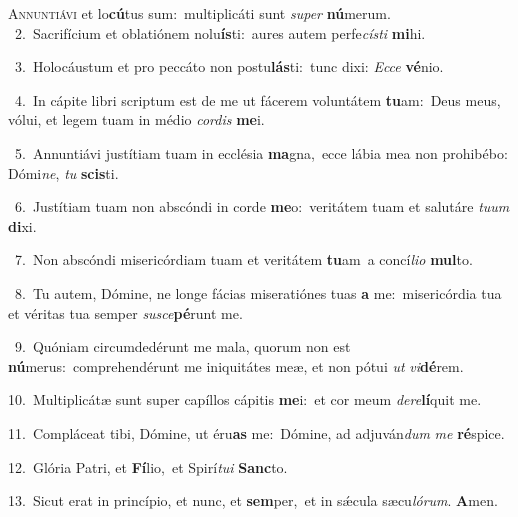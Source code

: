 \lettrine{\initial\textcolor{\initialcolor}{A}}{nnuntiávi} et lo\-\textbf{cú}\-tus sum:~\star multiplicáti sunt \textit{su}\-\textit{per} \textbf{nú}\-merum.\\
{\numbfont\textcolor{\numbcolor}{~2.}}~Sacrifícium et oblatiónem nolu\-\textbf{ís}\-ti:~\star aures autem perfe\-\textit{cís}\-\textit{ti} \textbf{mi}\-hi.\par
{\numbfont\textcolor{\numbcolor}{~3.}}~Holocáustum et pro peccáto non postu\-\textbf{lás}\-ti:~\star tunc dixi: \textit{Ec}\-\textit{ce} \textbf{vé}\-nio.\par
{\numbfont\textcolor{\numbcolor}{~4.}}~In cápite libri scriptum est de me ut fácerem voluntátem \textbf{tu}\-am:~\star Deus meus, vólui, et legem tuam in médio \textit{cor}\-\textit{dis} \textbf{me}\-i.\par
{\numbfont\textcolor{\numbcolor}{~5.}}~Annuntiávi justítiam tuam in ecclésia \textbf{ma}\-gna,~\star ecce lábia mea non prohibébo: Dómi\-\textit{ne}\-, \textit{tu} \textbf{scis}\-ti.\par
{\numbfont\textcolor{\numbcolor}{~6.}}~Justítiam tuam non abscóndi in corde \textbf{me}\-o:~\star veritátem tuam et salutáre \textit{tu}\-\textit{um} \textbf{di}\-xi.\par
{\numbfont\textcolor{\numbcolor}{~7.}}~Non abscóndi misericórdiam tuam et veritátem \textbf{tu}\-am~\star a concí\-\textit{li}\-\textit{o} \textbf{mul}\-to.\par
{\numbfont\textcolor{\numbcolor}{~8.}}~Tu autem, Dómine, ne longe fácias miseratiónes tuas \textbf{a} me:~\star misericórdia tua et véritas tua semper \textit{su}\-\textit{sce}\textbf{pé}runt me.\par
{\numbfont\textcolor{\numbcolor}{~9.}}~Quóniam circumdedérunt me mala, quorum non est \textbf{nú}\-merus:~\star comprehendérunt me iniquitátes meæ, et non pótui \textit{ut} \textit{vi}\-\textbf{dé}rem.\par
{\numbfont\textcolor{\numbcolor}{10.}}~Multiplicátæ sunt super capíllos cápitis \textbf{me}\-i:~\star et cor meum \textit{de}\-\textit{re}\textbf{lí}quit me.\par
{\numbfont\textcolor{\numbcolor}{11.}}~Compláceat tibi, Dómine, ut éru\textbf{as} me:~\star Dómine, ad adjuván\textit{dum} \textit{me} \textbf{ré}\-spice.\par
{\numbfont\textcolor{\numbcolor}{12.}}~Glória Patri, et \textbf{Fí}\-lio,~\star et Spirí\-\textit{tu}\-\textit{i} \textbf{Sanc}\-to.\par
{\numbfont\textcolor{\numbcolor}{13.}}~Sicut erat in princípio, et nunc, et \textbf{sem}\-per,~\star et in sǽcula sæcu\-\textit{ló}\-\textit{rum}. \textbf{A}\-men.\par
